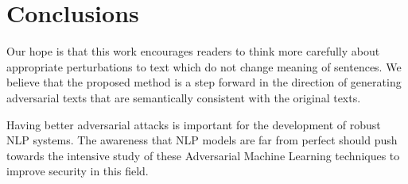 \section{Conclusions}\label{sec:conclusions}


Our hope is that this work encourages readers to think more carefully about appropriate perturbations to text which do not change meaning of sentences.
We believe that the proposed method is a step forward in the direction of generating adversarial texts that are semantically consistent with the original texts.

Having better adversarial attacks is important for the development of robust NLP systems. 
The awareness that NLP models are far from perfect should push towards the intensive study of these Adversarial Machine Learning techniques to improve security in this field.

